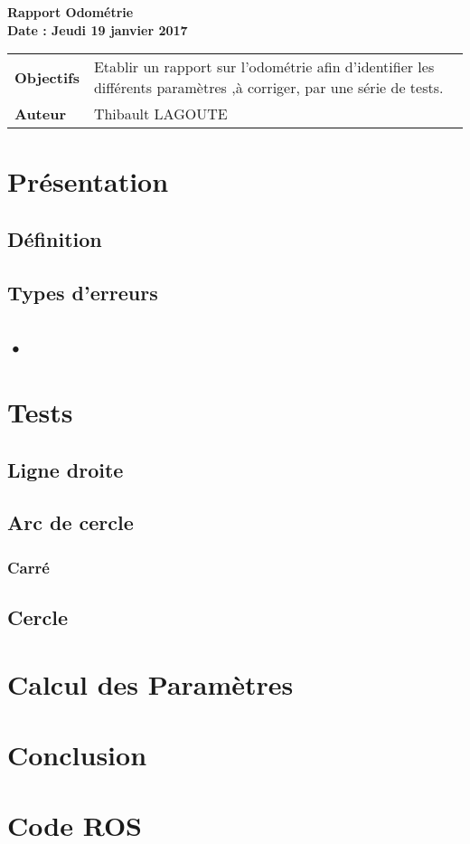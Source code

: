 \documentclass[a4wide,10pt]{article}
\begin{document}
\thispagestyle{empty}

\begin{center}
\LARGE \bfseries  Rapport Odométrie\\
\large \bfseries  Date : Jeudi 19 janvier 2017

\vspace{0.33cm}
\end{center}

\begin{center}
\begin{tabular}{ p{2.2cm}  p{13.6cm} }
\textbf{Objectifs} & Etablir un rapport sur l'odométrie afin d'identifier les différents paramètres ,à corriger, par une série de tests. \\
\textbf{Auteur} & Thibault LAGOUTE \\
\end{tabular}
\end{center}

\section{Présentation}

\subsection{Définition}
\subsection*{Types d'erreurs}
\subsection*{•}


\section*{Tests}


\subsection*{Ligne droite}

\subsection*{Arc de cercle}

\subsubsection*{Carré}

\subsection*{Cercle}

\section*{Calcul des Paramètres}


\section*{Conclusion}

\section*{Code ROS}
\end{document}
